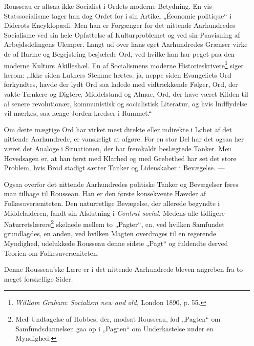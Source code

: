 \documentclass[12pt,a4paper,openany]{book}
\newcommand{\opage}[1]{\marginnote{\footnotesize\textit{[#1]}}}
\begin{document}
Rousseau er altsaa ikke Socialist i Ordets moderne Betydning.
En vis Statssocialisme tager han dog Ordet for i sin
Artikel „Économie politique“ i Diderots Encyklopædi. Men
han er Forgænger for det nittende Aarhundredes Socialisme
ved sin hele Opfattelse af Kulturproblemet og ved sin Paavisning
af Arbejdsdelingens Ulemper. Langt ud over hans eget
\setcounter{footnote}{0}%
\opage{138}Aarhundredes Grænser virke de af Harme og Begejstring besjælede
Ord, ved hvilke han har peget paa den moderne Kulturs
Akilleshæl. En af Socialismens moderne Historieskrivere\footnote[1]{\emph{William Graham}: \textit{Socialism new and old,} London 1890, p. 55.}
siger herom: „Ikke siden Luthers Stemme hørtes, ja, neppe
siden Evangeliets Ord forkyndtes, havde der lydt Ord saa ladede
med vidtrækkende Følger, Ord, der vakte Tænkere og
Digtere, Middelstand og Almue, Ord, der have været Kilden
til al senere revolutionær, kommunistisk og socialistisk Literatur,
og hvis Indflydelse vil mærkes, saa længe Jorden kredser
i Rummet.“

Om dette mægtige Ord har virket mest direkte eller indirekte
i Løbet af det nittende Aarhundrede, er vanskeligt at
afgøre. For en stor Del har det ogsaa her været det Analoge
i Situationen, der har fremkaldt beslægtede Tanker. Men
Hovedsagen er, at han først med Klarhed og med Grebethed
har set det store Problem, hvis Brod stadigt sætter Tanker og
Lidenskaber i Bevægelse. ---

Ogsaa overfor det nittende Aarhundredes politiske Tanker
og Bevægelser føres man tilbage til Rousseau. Han er den
første konsekvente Hævder af Folkesuveræniteten. Den naturretlige
Bevægelse, der allerede begyndte i Middelalderen, fandt
sin Afslutning i \textit{Contrat social.} Medens alle tidligere Naturretslærere\footnote[2]{Med Undtagelse af Hobbes, der, modsat Rousseau, lod „Pagten“ om Samfundsdannelsen gaa op i „Pagten“ om Underkastelse under en Myndighed.}
skelnede mellem to „Pagter“, en, ved hvilken
Samfundet grundlagdes, en anden, ved hvilken Magten overdroges
til en regerende Myndighed, udelukkede Rousseau
denne sidste „Pagt“ og fuldendte derved Teorien om Folkesuveræniteten.


Denne Rousseau’ske Lære er i det nittende Aarhundrede
bleven angreben fra to meget forskellige Sider.
\end{document}
